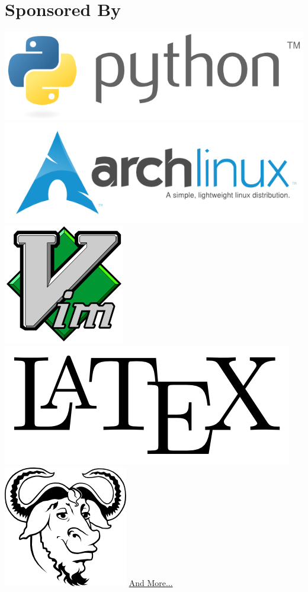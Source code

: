 \documentclass[]{friggeri-cv}
\begin{document}
\begin{aside}
~
~
~
  \section{Sponsored By}
    \includegraphics[scale=0.18]{img/python.png}
    \includegraphics[scale=0.18]{img/arch.png}
    \includegraphics[scale=0.06]{img/vim.png}
    \includegraphics[scale=0.06]{img/latex.png}
    \includegraphics[scale=0.08]{img/gnu.png}
    \href{http://hberaud.tilola.com/technologies}{And More...}
    ~

\end{aside}
\end{document}
